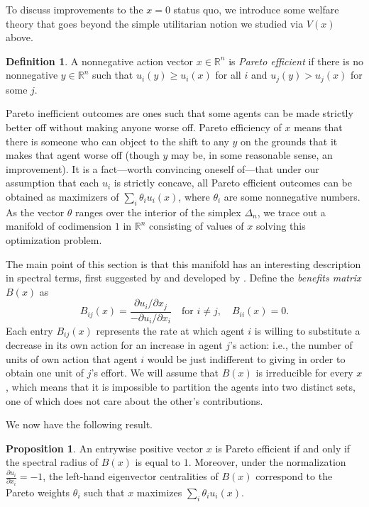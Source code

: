 \documentclass{notices}
\theoremstyle{definition}\newtheorem{problem}{Problem}
\theoremstyle{definition} \newtheorem{remark}{Remark}
\theoremstyle{definition} \newtheorem{claim}{Claim}
\theoremstyle{definition} \newtheorem{thm}{Theorem}
\theoremstyle{definition} \newtheorem*{thmNoNum}{Theorem}
\theoremstyle{definition} \newtheorem{definition}{Definition}
\theoremstyle{definition} \theoremstyle{remark}
\theoremstyle{definition} \newtheorem{note}{Note}
\theoremstyle{definition} \newtheorem{notation}{Notation}
\theoremstyle{definition} \theoremstyle{plain}
\theoremstyle{definition} \newtheorem{condition}{Condition}
\theoremstyle{definition} \newtheorem{lem}{Lemma}
\theoremstyle{definition} \newtheorem{corollary}{Corollary}
\theoremstyle{definition} \newtheorem{prop}{Proposition}
\theoremstyle{definition} \newtheorem{ax}{Axiom}
\theoremstyle{definition} \newtheorem{assumption}{Assumption}
\theoremstyle{definition} \newtheorem{example}{Example}
\theoremstyle{definition} \newtheorem{rmk}{Remark}
\theoremstyle{definition} \newtheorem{res}{Result}
\theoremstyle{definition} \newtheorem{que}{Question}
\theoremstyle{definition} \newtheorem{conjecture}{Conjecture}
\theoremstyle{definition}
\begin{document}
To discuss improvements to the $x=0$ status quo, we introduce some welfare theory that goes beyond the simple utilitarian notion we studied via $V(x)$ above.

\begin{definition}
A nonnegative action vector $x \in \mathbb{R}^n$ is \emph{Pareto efficient} if there is no nonnegative $y \in \mathbb{R}^n$ such that $u_i(y) \geq u_i(x)$ for all $i$ and $u_j(y) > u_j(x)$ for some $j$. 
\end{definition}

Pareto inefficient outcomes are ones such that some agents can be made strictly better off without making anyone worse off. Pareto efficiency of $x$ means that there is someone who can object to the shift to any $y$ on the grounds that it makes that agent worse off (though $y$ may be, in some reasonable sense, an improvement).
It is a fact---worth convincing oneself of---that under our assumption that each $u_i$ is strictly concave, all Pareto efficient outcomes can be obtained as maximizers of $\sum_i \theta_i u_i(x)$, where $\theta_i$ are some nonnegative numbers. As the vector $\theta$ ranges over the interior of the simplex $\Delta_n$, we trace out a manifold of codimension $1$ in $ \mathbb{R}^n$ consisting of values of $x$ solving this optimization problem.


The main point of this section is that this manifold has an interesting description in spectral terms, first suggested by \cite{ghosh2008charity} and developed by \cite{elliott2019network}. Define the \emph{benefits matrix} $B(x)$ as
$$
B_{ij}(x) = \frac{{\partial u_i}/{\partial x_j}}{-{\partial u_i}/{\partial x_i}} \quad \text{for } i \neq j, \quad B_{ii}(x) = 0.
$$
Each entry $B_{ij}(x)$ represents the rate at which agent $i$ is willing to substitute a decrease in its own action for an increase in agent $j$'s action: i.e., the number of units of own action that agent $i$ would be just indifferent to giving in order to obtain one unit of $j$'s effort. We will assume that $B(x)$ is irreducible for every $x$, which means that it is impossible to partition the agents into two distinct sets, one of which does not care about the other's contributions.

We now have the following result.
\begin{prop}\label{prop:pareto}
An entrywise positive vector $x$ is Pareto efficient if and only if the spectral radius of $B(x)$ is equal to $1$. Moreover, under the normalization $\frac{\partial u_i}{\partial x_i} = -1$, the left-hand eigenvector centralities of $B(x)$ correspond to the {Pareto weights} $\theta_i$ such that $x$ maximizes $\sum_{i} \theta_i u_i(x)$.
\end{prop}
\end{document}
